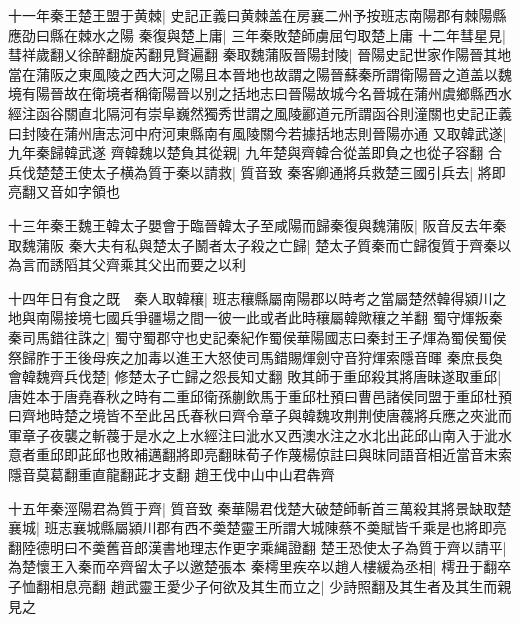 十一年秦王楚王盟于黄棘|{
	史記正義曰黄棘盖在房襄二州予按班志南陽郡有棘陽縣應劭曰縣在棘水之陽}
秦復與楚上庸|{
	三年秦敗楚師虜屈匄取楚上庸}
十二年彗星見|{
	彗祥歲翻乂徐醉翻旋芮翻見賢遍翻}
秦取魏蒲阪晉陽封陵|{
	晉陽史記世家作陽晉其地當在蒲阪之東風陵之西大河之陽且本晉地也故謂之陽晉蘇秦所謂衛陽晉之道盖以魏境有陽晉故在衛境者稱衛陽晉以别之括地志曰晉陽故城今名晉城在蒲州虞鄉縣西水經注函谷關直北隔河有崇阜巍然獨秀世謂之風陵酈道元所謂函谷則潼關也史記正義曰封陵在蒲州唐志河中府河東縣南有風陵關今若據括地志則晉陽亦通}
又取韓武遂|{
	九年秦歸韓武遂}
齊韓魏以楚負其從親|{
	九年楚與齊韓合從盖即負之也從子容翻}
合兵伐楚楚王使太子横為質于秦以請救|{
	質音致}
秦客卿通將兵救楚三國引兵去|{
	將即亮翻又音如字領也}


十三年秦王魏王韓太子嬰會于臨晉韓太子至咸陽而歸秦復與魏蒲阪|{
	阪音反去年秦取魏蒲阪}
秦大夫有私與楚太子鬭者太子殺之亡歸|{
	楚太子質秦而亡歸復質于齊秦以為言而誘䧟其父齊乘其父出而要之以利}


十四年日有食之既　秦人取韓穰|{
	班志穰縣屬南陽郡以時考之當屬楚然韓得潁川之地與南陽接境七國兵爭疆場之間一彼一此或者此時穰屬韓歟穰之羊翻}
蜀守煇叛秦秦司馬錯往誅之|{
	蜀守蜀郡守也史記秦紀作蜀侯華陽國志曰秦封王子煇為蜀侯蜀侯祭歸胙于王後母疾之加毒以進王大怒使司馬錯賜煇劍守音狩煇索隱音暉}
秦庶長奐會韓魏齊兵伐楚|{
	修楚太子亡歸之怨長知丈翻}
敗其師于重邱殺其將唐昧遂取重邱|{
	唐姓本于唐堯春秋之時有二重邱衛孫蒯飲馬于重邱杜預曰曹邑諸侯同盟于重邱杜預曰齊地時楚之境皆不至此呂氏春秋曰齊令章子與韓魏攻荆荆使唐薎將兵應之夾泚而軍章子夜襲之斬薎于是水之上水經注曰泚水又西澳水注之水北出茈邱山南入于泚水意者重邱即茈邱也敗補邁翻將即亮翻昧荀子作蔑楊倞註曰與昩同語音相近當音末索隱音莫葛翻重直龍翻茈才支翻}
趙王伐中山中山君犇齊

十五年秦涇陽君為質于齊|{
	質音致}
秦華陽君伐楚大破楚師斬首三萬殺其將景缺取楚襄城|{
	班志襄城縣屬潁川郡有西不羮楚靈王所謂大城陳蔡不羮賦皆千乘是也將即亮翻陸德明曰不羮舊音郎漢書地理志作更字乘䋲證翻}
楚王恐使太子為質于齊以請平|{
	為楚懷王入秦而卒齊留太子以邀楚張本}
秦樗里疾卒以趙人樓緩為丞相|{
	樗丑于翻卒子恤翻相息亮翻}
趙武靈王愛少子何欲及其生而立之|{
	少詩照翻及其生者及其生而親見之}


